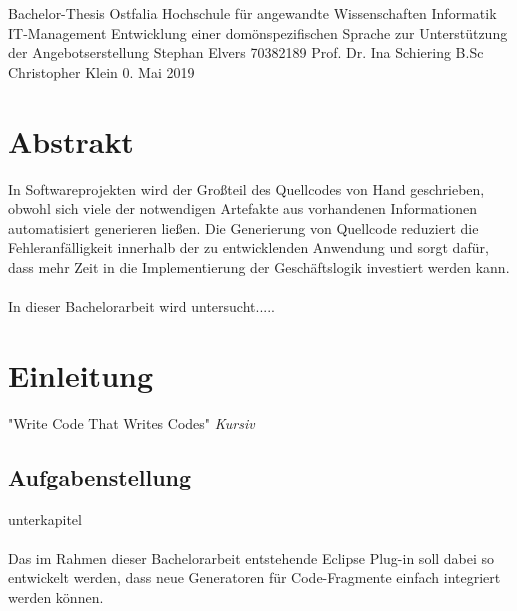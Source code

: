 \documentclass[a4paper,12pt]{scrreprt}
\begin{document}

\titelSeiteDaten
{Bachelor-Thesis} %
{}
{Ostfalia Hochschule für angewandte Wissenschaften} %
{Informatik} %
{IT-Management} %
{Entwicklung einer domönspezifischen Sprache zur Unterstützung der Angebotserstellung} %
{}
{}
\titelSeiteNamen
{Stephan Elvers} %
{70382189} %
{Prof. Dr. Ina Schiering} %
{B.Sc Christopher Klein}
{0. Mai 2019} %


\fontsize{12pt}{13pt}\selectfont



\setcounter{tocdepth}{1}

\tableofcontents


\leerSeiteInhalt


\sloppy

\chapter{Abstrakt}
In Softwareprojekten wird der Großteil des Quellcodes von Hand geschrieben, obwohl sich viele der notwendigen Artefakte aus vorhandenen Informationen automatisiert generieren ließen. Die Generierung von Quellcode reduziert die Fehleranfälligkeit innerhalb der zu entwicklenden Anwendung und sorgt dafür, dass mehr Zeit in die Implementierung der Geschäftslogik investiert werden kann.
\\
\\
In dieser Bachelorarbeit wird untersucht.....
\chapter{Einleitung}
"Write Code That Writes Codes" \cite{ht2006}
 \textit{Kursiv}

\section{Aufgabenstellung}
unterkapitel
\\
\\
Das im Rahmen dieser Bachelorarbeit entstehende Eclipse Plug-in soll dabei so entwickelt werden, dass neue Generatoren für Code-Fragmente einfach integriert werden können.
\end{document}
